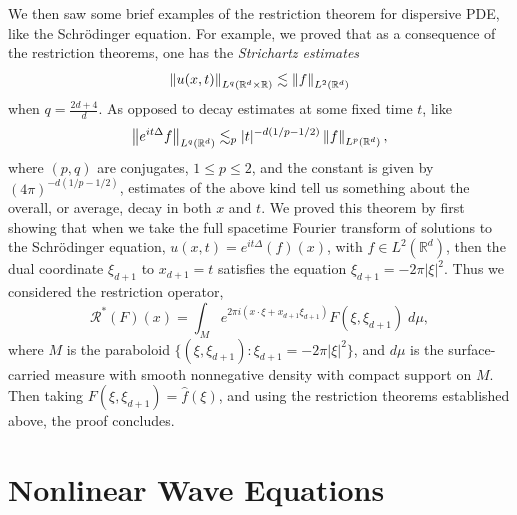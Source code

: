 \documentclass{article}
\begin{document}
	We then saw some brief examples of the restriction theorem for dispersive PDE, like the Schr\"odinger equation. For example, we proved that as a consequence of the restriction theorems, one has the \textit{Strichartz estimates}
		\begin{equation*}
			\left\Vert u(x, t) \right\Vert_{L^{q}(\mathbb{R}^{d} \times \mathbb{R})} \lesssim \left\Vert f \right\Vert_{L^{2}(\mathbb{R}^{d})}
		\end{equation*} 
	when $q = \frac{2d + 4}{d}$. 
	As opposed to decay estimates at some fixed time $t$, like 
	\begin{equation*}
		\left\Vert e^{it\Delta}f \right\Vert_{L^{q}(\mathbb{R}^{d})} \lesssim_{p}|t|^{-d(1/p - 1/2)}\left\Vert f \right\Vert_{L^{p}(\mathbb{R}^{d})}, 
	\end{equation*} 
	where $(p, q)$ are conjugates, $1 \leq p \leq 2$, and the constant is given by $(4\pi)^{-d(1/p -1/2)}$, estimates of the above kind tell us something about the overall, or average, decay in both $x$ and $t$. We proved this theorem by first showing that when we take the full spacetime Fourier transform of solutions to the Schr\"odinger equation, $u(x, t) = e^{it\Delta}(f)(x)$, with $f \in L^{2}(\mathbb{R}^{d})$, then the dual coordinate $\xi_{d + 1}$ to $x_{d + 1} = t$ satisfies the equation $\xi_{d + 1} = -2\pi |\xi|^{2}$. Thus we considered the restriction operator, 
	\begin{equation*}
		\mathcal{R}^{\ast}(F)(x)= \int_{M}e^{2\pi i (x \cdot \xi + x_{d + 1}\xi_{d + 1})}F(\xi, \xi_{d + 1})\;d\mu, 
	\end{equation*}
	where $M$ is the paraboloid $\{(\xi, \xi_{d + 1}): \xi_{d + 1} = -2\pi |\xi|^{2}\}$, and $d\mu$ is the surface-carried measure with smooth nonnegative density with compact support on $M$. Then taking $F(\xi, \xi_{d + 1}) = \hat{f}(\xi)$, and using the restriction theorems established above, the proof concludes. 
	\newpage 
	\part{Nonlinear Wave Equations} 
\end{document}
